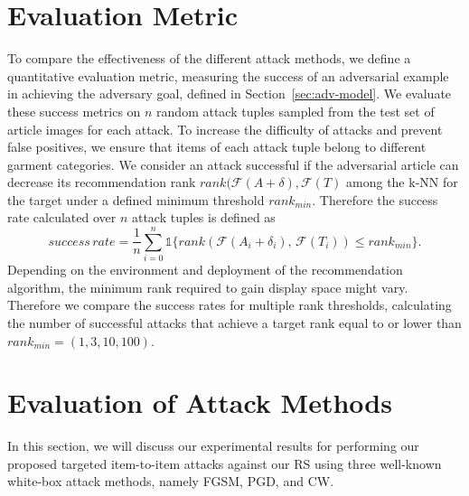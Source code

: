 \section{Evaluation Metric}
To compare the effectiveness of the different attack methods, we define a quantitative evaluation metric, measuring the success of an adversarial example in achieving the adversary goal, defined in Section~\ref{sec:adv-model}. We evaluate these success metrics on $n$ random attack tuples sampled from the test set of article images for each attack. To increase the difficulty of attacks and prevent false positives, we ensure that items of each attack tuple belong to different garment categories. We consider an attack successful if the adversarial article can decrease its recommendation rank $rank(\mathcal{F}(A+\delta), \mathcal{F}(T)$ among the \ac{k-NN} for the target under a defined minimum threshold $rank_{min}$. Therefore the success rate calculated over $n$ attack tuples is defined as
\begin{equation}
success\,rate =  \frac{1}{n} \sum\limits_{i=0}^{n} \mathds{1}  \big\{ rank( \mathcal{F}(A_i+\delta_i), \,\mathcal{F}(T_i)) \le rank_{min} \big\} .
\label{eq:adv-success}
\end{equation}
Depending on the environment and deployment of the recommendation algorithm, the minimum rank required to gain display space might vary. Therefore we compare the success rates for multiple rank thresholds, calculating the number of successful attacks that achieve a target rank equal to or lower than $rank_{min}=(1, 3, 10, 100)$. 

\section{Evaluation of Attack Methods}
In this section, we will discuss our experimental results for performing our proposed targeted item-to-item attacks against our \acl{RS} using three well-known white-box attack methods, namely \ac{FGSM}, \ac{PGD}, and \ac{CW}.

